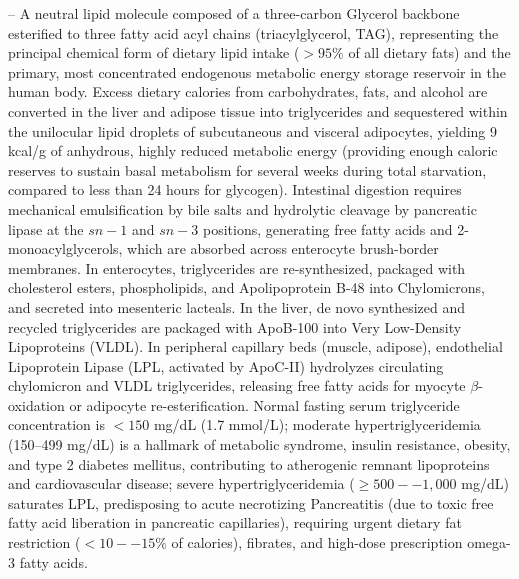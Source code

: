 -- A neutral lipid molecule composed of a three-carbon Glycerol backbone esterified to three fatty acid acyl chains (triacylglycerol, TAG), representing the principal chemical form of dietary lipid intake ($>95\%$ of all dietary fats) and the primary, most concentrated endogenous metabolic energy storage reservoir in the human body. Excess dietary calories from carbohydrates, fats, and alcohol are converted in the liver and adipose tissue into triglycerides and sequestered within the unilocular lipid droplets of subcutaneous and visceral adipocytes, yielding 9 kcal/g of anhydrous, highly reduced metabolic energy (providing enough caloric reserves to sustain basal metabolism for several weeks during total starvation, compared to less than 24 hours for glycogen). Intestinal digestion requires mechanical emulsification by bile salts and hydrolytic cleavage by pancreatic lipase at the $sn-1$ and $sn-3$ positions, generating free fatty acids and 2-monoacylglycerols, which are absorbed across enterocyte brush-border membranes. In enterocytes, triglycerides are re-synthesized, packaged with cholesterol esters, phospholipids, and Apolipoprotein B-48 into Chylomicrons, and secreted into mesenteric lacteals. In the liver, de novo synthesized and recycled triglycerides are packaged with ApoB-100 into Very Low-Density Lipoproteins (VLDL). In peripheral capillary beds (muscle, adipose), endothelial Lipoprotein Lipase (LPL, activated by ApoC-II) hydrolyzes circulating chylomicron and VLDL triglycerides, releasing free fatty acids for myocyte $\beta$-oxidation or adipocyte re-esterification. Normal fasting serum triglyceride concentration is $<150$ mg/dL (1.7 mmol/L); moderate hypertriglyceridemia (150--499 mg/dL) is a hallmark of metabolic syndrome, insulin resistance, obesity, and type 2 diabetes mellitus, contributing to atherogenic remnant lipoproteins and cardiovascular disease; severe hypertriglyceridemia ($\ge 500--1,000$ mg/dL) saturates LPL, predisposing to acute necrotizing Pancreatitis (due to toxic free fatty acid liberation in pancreatic capillaries), requiring urgent dietary fat restriction ($<10--15\%$ of calories), fibrates, and high-dose prescription omega-3 fatty acids.

